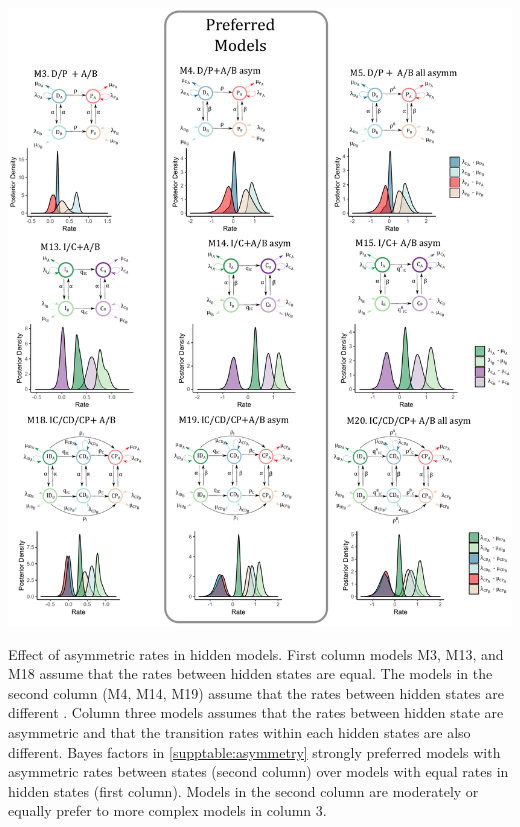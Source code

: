 \begin{suppfigure}
\includegraphics[width=\textwidth]{figS17.pdf}
\caption{Effect of asymmetric rates in hidden models. First column models M3, M13, and M18 assume that the rates between hidden states are equal. The models in the second column (M4, M14, M19) assume that the rates between hidden states are different . Column three models assumes that the rates between hidden state are asymmetric and that the transition rates within each hidden states are also different. Bayes factors in \cref{supptable:asymmetry} strongly preferred models with asymmetric rates between states (second column) over models with equal rates in hidden states (first column). Models in the second column are moderately or equally prefer to more complex models in column 3. } %
\label{suppfigure:asymmetric}
\end{suppfigure}


